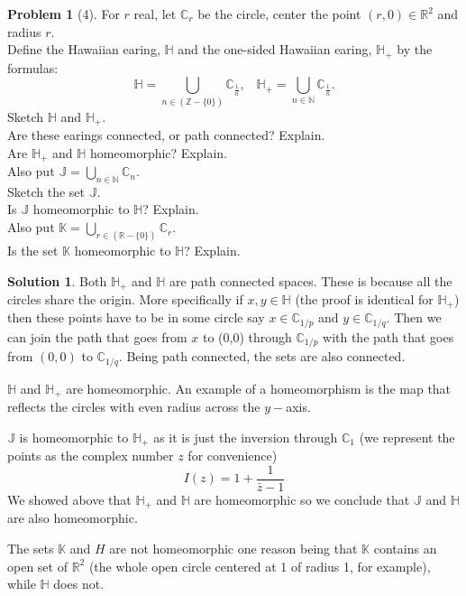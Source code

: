 \documentclass{article}
\theoremstyle{definition}
\newtheorem*{soln}{Solution}
\newtheorem*{prob}{Problem}
\theoremstyle{theorem}
\newcommand{\R}{\mathbb{R}}
\newcommand{\J}{\mathbb{J}}
\newcommand{\C}{\mathbb{C}}
\newcommand{\K}{\mathbb{K}}
\newcommand{\HP}{\mathbb{H}}
\begin{document}
\begin{prob}[4]
For $r$ real, let $\mathbb{C}_r$ be the circle, center the point  $(r, 0) \in \mathbb{R}^2$ and radius $r$. \\ Define the Hawaiian earing, $\mathbb{H}$ and the one-sided Hawaiian earing, $\mathbb{H}_+$ by the formulas:
\[ \mathbb{H} =   \bigcup_{n \in (\mathbb{Z} - \{0\})} \mathbb{C}_{\frac{1}{n}}, \hspace{10pt} \mathbb{H}_+ =   \bigcup_{n \in \mathbb{N}} \mathbb{C}_{\frac{1}{n}}. \] 
Sketch $\mathbb{H}$ and $\mathbb{H}_+$.\\
Are these earings connected, or path connected? Explain. \\
Are $\mathbb{H}_+$ and $\mathbb{H}$ homeomorphic? Explain.\\
Also put $\mathbb{J} =  \bigcup_{n \in \mathbb{N}} \mathbb{C}_{n}$.\\
Sketch the set $\mathbb{J}$.\\
Is $\mathbb{J}$ homeomorphic to $\mathbb{H}$? Explain.\\
Also put $\mathbb{K} =  \bigcup_{r \in (\mathbb{R} - \{0\})} \mathbb{C}_{r}$.\\
Is the set $\mathbb{K}$ homeomorphic to $\mathbb{H}$? Explain.


\end{prob}
\begin{soln}
%

    Both $\HP_+$ and $\HP$ are path connected spaces. These is because all the circles share the origin. More specifically if $x,y\in\HP$ (the proof is identical for $\HP_+$) then these points have to be in some circle say $x\in \C_{1/p}$ and $y\in \C_{1/q}$. Then we can join the path that goes from $x$ to (0,0) through $\C_{1/p} $ with the path that goes from $(0,0)$ to $\C_{1/q}$. Being path connected, the sets are also connected.

    $\HP$ and $\HP_+$ are homeomorphic. An example of a homeomorphism is the map that reflects the circles with even radius across the $y-$axis.

    $\J$ is homeomorphic to $\HP_+$ as it is just the inversion through $\C_1$ (we represent the points as the complex number $z$ for convenience)
    $$I(z) = 1 + \frac 1{\bar z - 1}$$ 
    We showed above that $\HP_+$ and $\HP$ are homeomorphic so we conclude that $\J$ and $\HP$ are also homeomorphic. 

    The sets $\K$ and $H$ are not homeomorphic one reason being that $\K$ contains an open set of $\R^2$ (the whole open circle centered at 1 of radius 1, for example), while $\HP$ does not.
\end{soln}
\vspace{1in}
\end{document}
